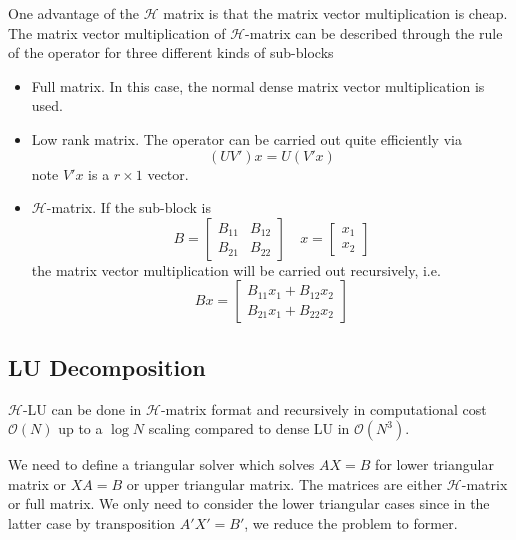 \documentclass[3p,,preprint,12pt]{elsarticle}
\theoremstyle{definition}
\begin{document}
One advantage of the $\mathcal{H}$ matrix is that the matrix vector multiplication is cheap. The matrix vector multiplication of $\mathcal{H}$-matrix can be described through the rule of the operator for three different kinds of sub-blocks
\begin{itemize}
	\item Full matrix. In this case, the normal dense matrix vector multiplication is used. 
	\item Low rank matrix. The operator can be carried out quite efficiently via
	\begin{equation}
		(UV')x = U(V'x)
	\end{equation}
	note $V'x$ is a $r\times 1$ vector.
	\item $\mathcal{H}$-matrix. If the sub-block is 
	\begin{equation}
		B = \begin{bmatrix}
			B_{11}&B_{12}\\
			B_{21}&B_{22}
		\end{bmatrix}\quad x = \begin{bmatrix}
			x_1\\
			x_2
		\end{bmatrix}
	\end{equation}
	the matrix vector multiplication will be carried out recursively, i.e.
	\begin{equation}
		Bx = \begin{bmatrix}
			B_{11} x_1 + B_{12}x_2\\
			B_{21} x_1 + B_{22}x_2
		\end{bmatrix}
	\end{equation}
\end{itemize}







\subsection{LU Decomposition}

$\mathcal{H}$-LU can be done in $\mathcal{H}$-matrix format and recursively in computational cost $\mathcal{O}(N)$ up to a $\log N$ scaling compared to dense LU in $\mathcal{O}(N^3)$.


We need to define a triangular solver which solves $AX=B$ for lower triangular matrix or $XA = B$ or upper triangular matrix. The matrices are either $\mathcal{H}$-matrix or full matrix. We only need to consider the lower triangular cases since in the latter case by transposition $A'X'=B'$, we reduce the problem to former. 
\end{document}
